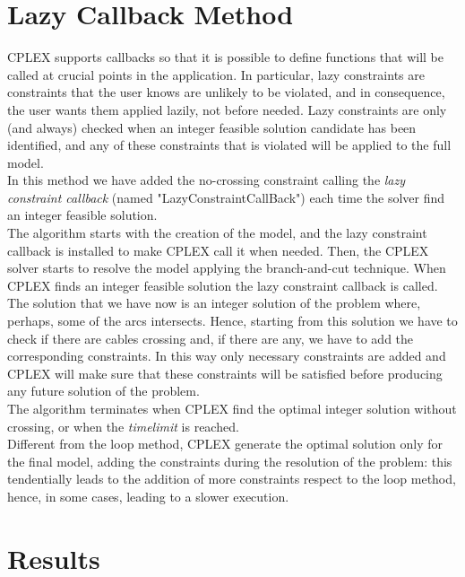 \section{Lazy Callback Method}
\textsc{CPLEX} supports callbacks so that it is possible to define functions that will be called at crucial points in the application. In particular, lazy constraints are constraints that the user knows are unlikely to be violated, and in consequence, the user
wants them applied lazily, not before needed. Lazy constraints are only (and always) checked when an integer feasible solution candidate has been identified, and any of these constraints that is violated will be applied to the full model. \\
In this method we have added the no-crossing constraint calling the \textit{lazy constraint callback} (named "LazyConstraintCallBack") each time the solver find an integer feasible solution. \\
The algorithm starts with the creation of the model, and the lazy constraint callback is installed to make \textsc{CPLEX} call it when needed. Then, the \textsc{CPLEX} solver starts to resolve the model applying the branch-and-cut technique. When \textsc{CPLEX} finds an integer feasible solution the lazy constraint callback is called. The solution that we have now is an integer solution of the problem where, perhaps, some of
the arcs intersects. Hence, starting from this solution we have to check if there are cables crossing and, if there are any, we have to add the corresponding constraints. In this way only necessary constraints are added and \textsc{CPLEX} will make sure that these constraints will be satisfied before producing any future solution of the problem.\\
The algorithm terminates when \textsc{CPLEX} find the optimal integer solution without crossing, or when the \textit{timelimit} is reached. \\
Different from the loop method, \textsc{CPLEX} generate the optimal solution only for the final model, adding the constraints during the resolution of the problem: this tendentially leads to the addition of more constraints respect to the loop method, hence, in some cases, leading to a slower execution.

\section{Results}

